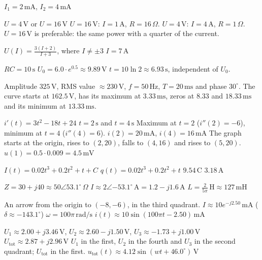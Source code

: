 \begin{facit}

 $I_1 = 2\,\text{mA}$, $I_2 = 4\,\text{mA}$

  $U = 4\,\text{V}$ or $U = 16\,\text{V}$
 $U = 16\,\text{V}$: $I = 1\,\text{A}$, $R = 16\,\Omega$. $U = 4\,\text{V}$: $I = 4\,\text{A}$,
$R = 1\,\Omega$. $U = 16\,\text{V}$ is preferable: the same power with a quarter of the current.

  $U(I) = \frac{3(I + 2)}{I + 3}$, where $I \neq \pm 3$  $I = 7\,\text{A}$

  $RC = 10\,\text{s}$  $U_0 = 6.0 \cdot e^{0.5} \approx 9.89\,\text{V}$
 $t = 10 \ln 2 \approx 6.93\,\text{s}$, independent of $U_0$.

  Amplitude $325\,\text{V}$, RMS value $\approx 230\,\text{V}$, $f = 50\,\text{Hz}$,
$T = 20\,\text{ms}$ and phase $30^{\circ}$.
 The curve starts at $162.5\,\text{V}$, has its maximum at $3.33\,\text{ms}$, zeros at
$8.33$ and $18.33\,\text{ms}$ and its minimum at $13.33\,\text{ms}$.

  $i'(t) = 3t^2 - 18t + 24$  $t = 2\,\text{s}$ and $t = 4\,\text{s}$
 Maximum at $t = 2$ ($i''(2) = -6$), minimum at $t = 4$ ($i''(4) = 6$).
 $i(2) = 20\,\text{mA}$, $i(4) = 16\,\text{mA}$
 The graph starts at the origin, rises to $(2, 20)$, falls to $(4, 16)$ and rises to
$(5, 20)$.
 $u(1) = 0.5 \cdot 0.009 = 4.5\,\text{mV}$

  $I(t) = 0.02t^3 + 0.2t^2 + t + C$
 $q(t) = 0.02t^3 + 0.2t^2 + t$  $9.54\,\text{C}$  $3.18\,\text{A}$

  $Z = 30 + j40 \approx 50\angle 53.1^{\circ}\,\Omega$
 $I \approx 2\angle{-53.1^{\circ}}\,\text{A} = 1.2 - j1.6\,\text{A}$
 $L = \frac{2}{5\pi}\,\text{H} \approx 127\,\text{mH}$

  An arrow from the origin to $(-8, -6)$, in the third quadrant.
 $I \approx 10e^{-j2.50}\,\text{mA}$ ($\delta \approx -143.1^{\circ}$)
 $\omega = 100\pi\,\text{rad/s}$  $i(t) \approx 10\sin(100\pi t - 2.50)\,\text{mA}$

  $U_1 \approx 2.00 + j3.46\,\text{V}$, $U_2 \approx 2.60 - j1.50\,\text{V}$,
$U_3 \approx -1.73 + j1.00\,\text{V}$
 $U_{\text{tot}} \approx 2.87 + j2.96\,\text{V}$
 $U_1$ in the first, $U_2$ in the fourth and $U_3$ in the second quadrant; $U_{\text{tot}}$ in
the first.
 $u_{\text{tot}}(t) \approx 4.12\sin(wt + 46.0^{\circ})\,\text{V}$

\end{facit}
